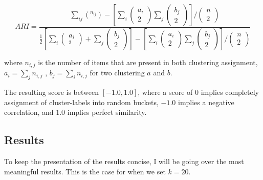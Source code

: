\documentclass[a4paper,12pt,twoside,openright]{report}
\begin{document}
\begin{equation}
A R I=\frac{\sum_{i j}\left(^{n_{i j}}\right)-\left[\sum_{i}\left(\begin{array}{c}a_{i} \\ 2\end{array}\right) \sum_{j}\left( \begin{array}{c}b_{j} \\ 2\end{array} \right)\right] /\left(\begin{array}{c}n \\ 2\end{array}\right)}{\frac{1}{2}\left[\sum_{i}\left(\begin{array}{c}a_{i} \\ _{2}\end{array}\right)+\sum_{j}\left(\begin{array}{l}b_{j} \\ 2\end{array}\right)\right]-\left[\sum_{i}\left(\begin{array}{c} a_{i} \\ 2\end{array}\right) \sum_{j}\left(\begin{array}{l}b_{j} \\ 2\end{array}\right)\right] /\left(\begin{array}{l}n \\ 2\end{array}\right)}
\end{equation}{\label{eq:adjustedrandomindex}}

where $n_{i,j}$ is the number of items that are present in both clustering assignment, $a_i = \sum_j n_{i,j}$ , $b_j = \sum_i n_{i,j}$ for two clustering $a$ and $b$.

The resulting score is between $[-1.0, 1.0]$, where a score of $0$ implies completely assignment of cluster-labels into random buckets, $-1.0$ implies a negative correlation, and $1.0$ implies perfect similarity.


\subsection{Results}

To keep the presentation of the results concise, I will be going over the most meaningful results.
This is the case for when we set $k=20$.
\end{document}
